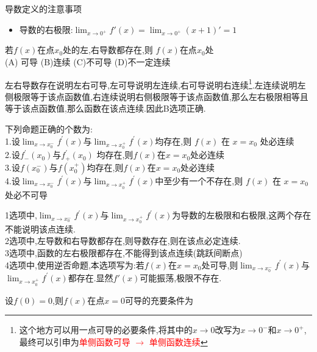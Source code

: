 \documentclass[8pt a4paper, oneside, UTF8]{ctexbook}  %
\begin{document}
\begin{sloppypar}
\begin{criterion}{导数定义的注意事项}{}
\begin{enumerate}
\begin{itemize}
                      \item 导数的右极限:$\lim_{x \to 0^+}f'(x)=\lim_{x\to 0^+}(x+1)' = 1$
                  \end{itemize}
        \end{enumerate}
    \end{criterion}
    \begin{problem}
    若$f(x)$在点$x_{0}$处的左,右导数都存在,则 $f(x)$在点$x_{0}$处\\
    (A) 可导 \quad (B)连续 \quad  (C)不可导 \quad (D)不一定连续
    \end{problem}
    \begin{solution}
        左右导数存在说明左右可导,左可导说明左连续,右可导说明右连续\footnote{这个地方可以用一点可导的必要条件,将其中的$x \to 0$改写为$x \to 0^-$和$x \to 0^+$,最终可以引申为\textcolor{red}{单侧函数可导 $\to$ 单侧函数连续}}.左连续说明左侧极限等于该点函数值,右连续说明右侧极限等于该点函数值,那么左右极限相等且等于该点函数值,那么函数在该点连续.因此B选项正确.
    \end{solution}
    \begin{problem}
    下列命题正确的个数为:\\
    1.设$\lim_{x\to x_0^-}f^{\prime}(x)$与$\lim_{x\to x_0^+}f^{\prime}(x)$均存在,则 $f(x)$ 在 $x=x_0$ 处必连续\\
    2.设$f^{\prime}_-(x_{0})$与$f^{\prime}_{+}(x_{0})$ 均存在,则$f(x)$在$x=x_{0}$处必连续\\
    3.设$f(x_{0}^{-})$与$f(x_{0}^{+})$均存在,则$f(x)$在$x=x_{0}$处必连续\\
    4.设$\lim_{x\to x_{0}^{-}}f^{\prime}(x)$与$\lim_{x\to x_{0}^{+}}f^{\prime}(x)$中至少有一个不存在,则 $f(x)$ 在 $x=x_0$ 处必不可导
    \end{problem}
    \begin{solution}
        1选项中,$\lim_{x\to x_0^-}f^{\prime}(x)$与$\lim_{x\to x_0^+}f^{\prime}(x)$为导数的左极限和右极限,这两个存在不能说明该点连续.\\
        2选项中,左导数和右导数都存在,则导数存在,则在该点必定连续.\\
        3选项中,函数的左右极限都存在,不能得到该点连续(跳跃间断点)\\
        4选项中,使用逆否命题,本选项写为:若$f(x)$在$x=x_0$处可导,则$\lim_{x\to x_{0}^{-}}f^{\prime}(x)$与$\lim_{x\to x_{0}^{+}}f^{\prime}(x)$都存在.显然$f'(x)$可能振荡,极限不存在.
    \end{solution}
    \begin{problem}
    设$f(0)=0$,则$f(x)$在点$x=0$可导的充要条件为\\

\end{problem}
\end{sloppypar}
\end{document}
